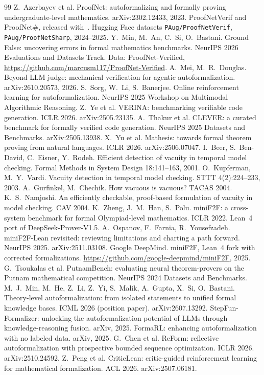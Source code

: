 \documentclass[10pt]{article}
\theoremstyle{definition}
\begin{document}
\begin{thebibliography}{99}
 Z.~Azerbayev et al. ProofNet: autoformalizing and formally proving undergraduate-level mathematics. arXiv:2302.12433, 2023.
 ProofNetVerif and ProofNet\#, released with~\cite{beq}. Hugging Face datasets \texttt{PAug/ProofNetVerif}, \texttt{PAug/ProofNetSharp}, 2024--2025.
 Y.~Min, M.~An, C.~Si, O.~Bastani. Ground False: uncovering errors in formal mathematics benchmarks. NeurIPS 2026 Evaluations and Datasets Track. Data: ProofNet-Verified, \url{https://github.com/marcusm117/ProofNet-Verified}.
 A.~Mei, M.~R.~Douglas. Beyond LLM judge: mechanical verification for agentic autoformalization. arXiv:2610.20573, 2026.
 S.~Sorg, W.~Li, S.~Banerjee. Online reinforcement learning for autoformalization. NeurIPS 2025 Workshop on Multimodal Algorithmic Reasoning.
 Z.~Ye et al. VERINA: benchmarking verifiable code generation. ICLR 2026. arXiv:2505.23135.
 A.~Thakur et al. CLEVER: a curated benchmark for formally verified code generation. NeurIPS 2025 Datasets and Benchmarks. arXiv:2505.13938.
 X.~Yu et al. Mathesis: towards formal theorem proving from natural languages. ICLR 2026. arXiv:2506.07047.
 I.~Beer, S.~Ben-David, C.~Eisner, Y.~Rodeh. Efficient detection of vacuity in temporal model checking. Formal Methods in System Design 18:141--163, 2001.
 O.~Kupferman, M.~Y.~Vardi. Vacuity detection in temporal model checking. STTT 4(2):224--233, 2003.
 A.~Gurfinkel, M.~Chechik. How vacuous is vacuous? TACAS 2004.
 K.~S.~Namjoshi. An efficiently checkable, proof-based formulation of vacuity in model checking. CAV 2004.
 K.~Zheng, J.~M.~Han, S.~Polu. miniF2F: a cross-system benchmark for formal Olympiad-level mathematics. ICLR 2022. Lean~4 port of DeepSeek-Prover-V1.5.
 A.~Ospanov, F.~Farnia, R.~Yousefzadeh. miniF2F-Lean revisited: reviewing limitations and charting a path forward. NeurIPS 2025. arXiv:2511.03108.
 Google DeepMind. miniF2F, Lean~4 fork with corrected formalizations. \url{https://github.com/google-deepmind/miniF2F}, 2025.
 G.~Tsoukalas et al. PutnamBench: evaluating neural theorem-provers on the Putnam mathematical competition. NeurIPS 2024 Datasets and Benchmarks.
 M.~J.~Min, M.~He, Z.~Li, Z.~Yi, S.~Malik, A.~Gupta, X.~Si, O.~Bastani. Theory-level autoformalization: from isolated statements to unified formal knowledge bases. ICML 2026 (position paper). arXiv:2607.13292.
 StepFun-Formalizer: unlocking the autoformalization potential of LLMs through knowledge-reasoning fusion. arXiv, 2025.
 FormaRL: enhancing autoformalization with no labeled data. arXiv, 2025.
 G.~Chen et al. ReForm: reflective autoformalization with prospective bounded sequence optimization. ICLR 2026. arXiv:2510.24592.
 Z.~Peng et al. CriticLean: critic-guided reinforcement learning for mathematical formalization. ACL 2026. arXiv:2507.06181.
\end{thebibliography}
\end{document}
